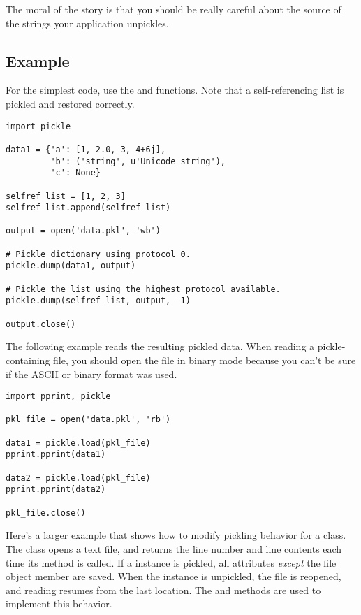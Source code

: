 The moral of the story is that you should be really careful about the
source of the strings your application unpickles.

\subsection{Example \label{pickle-example}}

For the simplest code, use the  and 
functions.  Note that a self-referencing list is pickled and restored
correctly.

\begin{verbatim}
import pickle

data1 = {'a': [1, 2.0, 3, 4+6j],
         'b': ('string', u'Unicode string'),
         'c': None}

selfref_list = [1, 2, 3]
selfref_list.append(selfref_list)

output = open('data.pkl', 'wb')

# Pickle dictionary using protocol 0.
pickle.dump(data1, output)

# Pickle the list using the highest protocol available.
pickle.dump(selfref_list, output, -1)

output.close()
\end{verbatim}

The following example reads the resulting pickled data.  When reading
a pickle-containing file, you should open the file in binary mode
because you can't be sure if the ASCII or binary format was used.

\begin{verbatim}
import pprint, pickle

pkl_file = open('data.pkl', 'rb')

data1 = pickle.load(pkl_file)
pprint.pprint(data1)

data2 = pickle.load(pkl_file)
pprint.pprint(data2)

pkl_file.close()
\end{verbatim}

Here's a larger example that shows how to modify pickling behavior for a
class.  The  class opens a text file, and returns
the line number and line contents each time its 
method is called. If a  instance is pickled, all
attributes \emph{except} the file object member are saved. When the
instance is unpickled, the file is reopened, and reading resumes from
the last location. The  and
 methods are used to implement this behavior.

